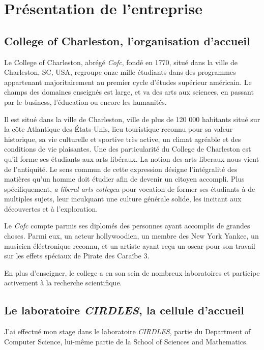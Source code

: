 \chapter{Présentation de l'entreprise}
\section{College of Charleston, l'organisation d'accueil}

Le College of Charleston, abrégé \textit{Cofc}, fondé en 1770, situé dans la ville de Charleston, SC, USA, regroupe onze mille étudiants dans des programmes appartenant majoritairement au premier cycle d’études supérieur américain. Le champs des domaines enseignés est large, et va des arts aux sciences, en passant par le business, l'éducation ou encore les humanités.
 
Il est situé dans la ville de Charleston, ville de plus de 120 000 habitants situé sur la côte Atlantique des États-Unis, lieu touristique reconnu pour sa valeur historique, sa vie culturelle et sportive très active, un climat agréable et des conditions de vie plaisantes.
Une des particularité du College de Charleston est qu’il forme ses étudiants aux arts libéraux.  La notion des arts liberaux nous vient de l’antiquité. Le sens commun de cette expression désigne l'intégralité des matières qu’un homme doit étudier afin de devenir un citoyen accompli. Plus spécifiquement, \textit{a liberal arts college}a pour vocation de former ses étudiants à de multiples sujets, leur inculquant une culture générale solide, les incitant aux découvertes et à l’exploration.

Le \textit{Cofc} compte parmis ses diplomés des personnes ayant accomplis de grandes choses. Parmi eux, un acteur hollywoodien, un membre des New York Yankee, un musicien éléctronique reconnu, et un artiste ayant reçu un oscar pour son travail sur les effets spéciaux de Pirate des Caraïbe 3.

En plus d’enseigner, le college a en son sein de nombreux laboratoires et participe activement à la recherche scientifique.

\section{Le laboratoire \textit{CIRDLES}, la cellule d’accueil}
J’ai effectué mon stage dans le laboratoire \textit{CIRDLES}, partie du Department of Computer Science, lui-même partie de la School of Sciences and Mathematics.

